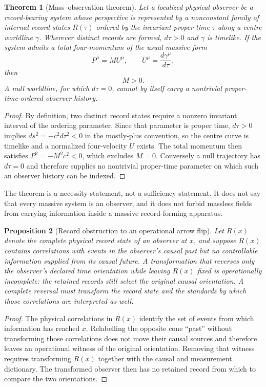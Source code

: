\documentclass[11pt]{article}
\newtheorem{theorem}{Theorem}[section]
\newtheorem{proposition}[theorem]{Proposition}
\theoremstyle{definition}\newtheorem{definition}[theorem]{Definition}
\theoremstyle{remark}\newtheorem{remark}[theorem]{Remark}\newtheorem{conjecture}[theorem]{Conjecture}
\begin{document}
\begin{theorem}[Mass--observation theorem]\label{thm:massobservation}
Let a localized physical observer be a record-bearing system whose perspective is represented by a nonconstant family of internal record states $R(\tau)$ ordered by the invariant proper time $\tau$ along a centre worldline $\gamma$. Wherever distinct records are formed, $d\tau>0$ and $\gamma$ is timelike. If the system admits a total four-momentum of the usual massive form
\begin{equation}
 P^\mu=M U^\mu,\qquad U^\mu=\frac{d\gamma^\mu}{d\tau},
\end{equation}
then
\begin{equation}
 \boxed{M>0.}
\end{equation}
A null worldline, for which $d\tau=0$, cannot by itself carry a nontrivial proper-time-ordered observer history.
\end{theorem}
\begin{proof}
By definition, two distinct record states require a nonzero invariant interval of the ordering parameter. Since that parameter is proper time, $d\tau>0$ implies $ds^2=-c^2d\tau^2<0$ in the mostly-plus convention, so the centre curve is timelike and a normalized four-velocity $U$ exists. The total momentum then satisfies $P^2=-M^2c^2<0$, which excludes $M=0$. Conversely a null trajectory has $d\tau=0$ and therefore supplies no nontrivial proper-time parameter on which such an observer history can be indexed.
\end{proof}
The theorem is a necessity statement, not a sufficiency statement. It does not say that every massive system is an observer, and it does not forbid massless fields from carrying information inside a massive record-forming apparatus.

\begin{proposition}[Record obstruction to an operational arrow flip]\label{prop:recordobstruction}
Let $R(x)$ denote the complete physical record state of an observer at $x$, and suppose $R(x)$ contains correlations with events in the observer's causal past but no controllable information supplied from its causal future. A transformation that reverses only the observer's declared time orientation while leaving $R(x)$ fixed is operationally incomplete: the retained records still select the original causal orientation. A complete reversal must transform the record state and the standards by which those correlations are interpreted as well.
\end{proposition}
\begin{proof}
The physical correlations in $R(x)$ identify the set of events from which information has reached $x$. Relabelling the opposite cone ``past'' without transforming those correlations does not move their causal sources and therefore leaves an operational witness of the original orientation. Removing that witness requires transforming $R(x)$ together with the causal and measurement dictionary. The transformed observer then has no retained record from which to compare the two orientations.
\end{proof}
\end{document}

